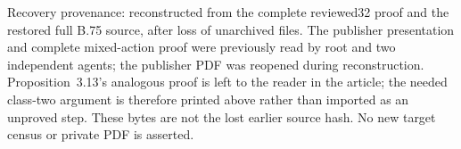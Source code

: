 \noindent\footnotesize
Recovery provenance: reconstructed from the complete reviewed32 proof
and the restored full B.75 source, after loss of unarchived files.
The publisher presentation and complete mixed-action proof were
previously read by root and two independent agents; the publisher PDF
was reopened during reconstruction. Proposition~3.13's analogous proof
is left to the reader in the article; the needed class-two argument is
therefore printed above rather than imported as an unproved step.
These bytes are not the lost earlier source hash. No new target census
or private PDF is asserted.
\normalsize
